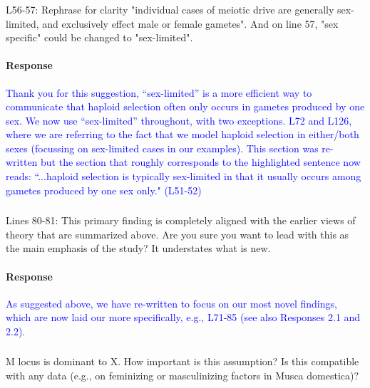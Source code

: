 \documentclass[10pt,letterpaper]{article}
\begin{document}
\noindent\subsubsection{}
L56-57: Rephrase for clarity "individual cases of meiotic drive are generally sex-limited, and exclusively effect male or female gametes". And on line 57, "sex specific" could be changed to "sex-limited".

\noindent\paragraph{Response}
\textcolor{blue}{
Thank you for this suggestion, ``sex-limited'' is a more efficient way to communicate that haploid selection often only occurs in gametes produced by one sex. 
We now use ``sex-limited'' throughout, with two exceptions. L72 and L126, where we are referring to the fact that we model haploid selection in either/both sexes (focussing on sex-limited cases in our examples). 
This section was re-written but the section that roughly corresponds to the highlighted sentence now reads: ``...haploid selection is typically sex-limited in that it usually occurs among gametes produced by one sex only." (L51-52) 
}

\noindent\subsubsection{}
Lines 80-81: This primary finding is completely aligned with the earlier views of theory that are summarized above. Are you sure you want to lead with this as the main emphasis of the study? It understates what is new.

\noindent\paragraph{Response}
\textcolor{blue}{
As suggested above, we have re-written to focus on our most novel findings, which are now laid our more specifically, e.g., L71-85 (see also Responses 2.1 and 2.2). 
}

\noindent\subsubsection{}
M locus is dominant to X. How important is this assumption? Is this compatible with any data (e.g., on feminizing or masculinizing factors in Musca domestica)?
\end{document}

